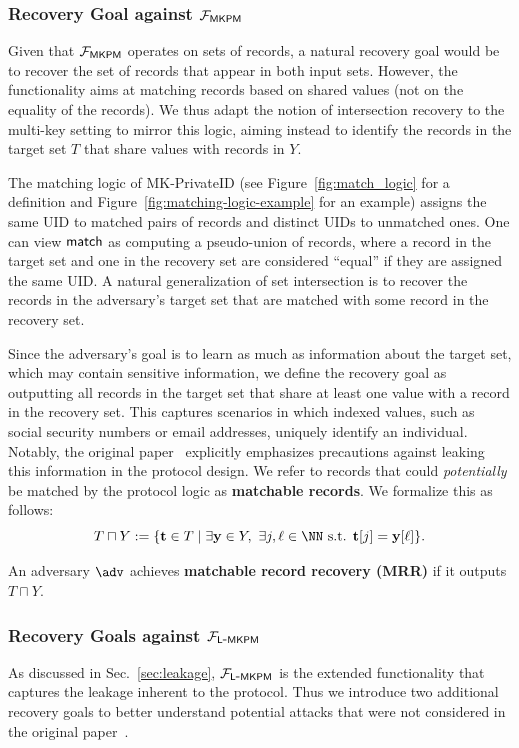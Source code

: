 \subsubsection{Recovery Goal against $\mathcal{F}_{\mathsf{MKPM}}$}
\label{sec:MRR_goal}
Given that $\mathcal{F}_{\mathsf{MKPM}}$ operates on sets of records, a natural recovery goal
would be to recover the set of records that appear in both input sets. However,
the functionality aims at matching records based on shared values (not on the
equality of the records). We thus adapt the notion of intersection recovery to
the multi-key setting to mirror this logic, aiming instead to identify the
records in the target set $T$ that share values with records in $Y$.

The matching logic of MK-PrivateID (see Figure~\ref{fig:match_logic} for a definition and Figure~\ref{fig:matching-logic-example} for an example) assigns the same UID to matched pairs of records and distinct UIDs to unmatched ones. One can view $\mathsf{match}$ as computing a pseudo-union of records, where a record in the target set and one in the recovery set are considered ``equal'' if they are assigned the same UID. A natural generalization of set intersection is to recover the records in the adversary’s target set that are matched with some record in the recovery set.

Since the adversary's goal is to learn as much as information about the target
set, which may contain sensitive information, we define the recovery goal as
outputting all records in the target set that share at least one value with a
record in the recovery set. This captures scenarios in which indexed values,
such as social security numbers or email addresses, uniquely identify an
individual. Notably, the original paper~\cite{MKPMC} explicitly emphasizes
precautions against leaking this information in the protocol design. We refer to
records that could \emph{potentially} be matched by the protocol logic as
\textbf{matchable records}. We formalize this as follows:
\[
  T \sqcap Y := \{\bt \in T \setdsc \exists \by \in Y,\ \exists j, \ell \in \NN
  \text{ s.t. } \bt[j] = \by[\ell]\}.
\]

\begin{definition}\label{def:matchable_records_recovery}
  An adversary $\adv$ achieves \textbf{matchable record recovery (MRR)} if it
  outputs $T\sqcap Y$.
\end{definition}

\subsubsection{Recovery Goals against $\mathcal{F}_{\mathsf{L\mbox{-}MKPM}}$}\label{sec:IRR_MR_goal}
As discussed in Sec.~\ref{sec:leakage}, $\mathcal{F}_{\mathsf{L\mbox{-}MKPM}}$ is the extended
functionality that captures the leakage inherent to the protocol. Thus we
introduce two additional recovery goals to better understand potential attacks
that were not considered in the original paper~\cite{MKPMC}.

